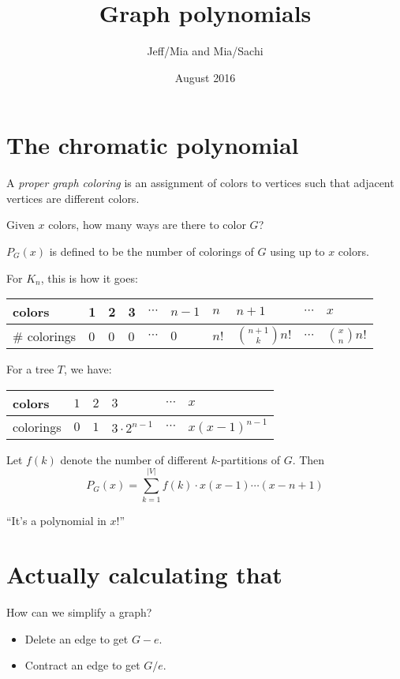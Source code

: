 \documentclass{article}
\title{Graph polynomials}
\author{Jeff/Mia and Mia/Sachi}
\date{August 2016}
\begin{document}
\maketitle

\section{The chromatic polynomial}
\begin{defn}
 A \textit{proper graph coloring} is an assignment of colors to vertices such
 that adjacent vertices are different colors. 
\end{defn}

\begin{question}
 Given $x$ colors, how many ways are there to color $G$? 
\end{question}
\begin{notation}
 $P_G(x)$ is defined to be the number of colorings of $G$ using up to $x$ colors. 
\end{notation}

For $K_n$, this is how it goes:
\begin{table}[h]
\centering
\label{my-label}
\begin{tabular}{l|lllllllll}
 colors &1  &2  &3  &$\cdots$ &$n-1$ &$n$ &$n+1$ &$\cdots$ &$x$  \\
  \hline
 \# colorings &0  &0  &0  &$\cdots$ &$0$ &$n!$ &$\binom {n+1} k n!$ &$\cdots$ &$\binom x n {n!}$ 
\end{tabular}
\end{table}

For a tree $T$, we have:
\begin{table}[h]
  \centering
  \label{tree-table}
  \begin{tabular}{l|lllll}
    colors &$1$ &$2$ &$3$ &$\cdots$ &$x$\\
    \hline
    colorings &$0$ &$1$ &$3\cdot 2^{n-1}$ &$\cdots$ &$x{(x-1)}^{n-1}$
  \end{tabular} 
\end{table}

Let $f(k)$ denote the number of different $k$-partitions of $G$. Then
$$P_G(x) = \sum_{k=1}^{|V|} f(k)\cdot x(x-1)\cdots(x-n+1)$$

``It's a polynomial in $x$!''

\section{Actually calculating that}
How can we simplify a graph?
\begin{itemize}
\item Delete an edge to get $G-e$.
\item Contract an edge to get $G/e$.
\end{itemize}
\end{document}
